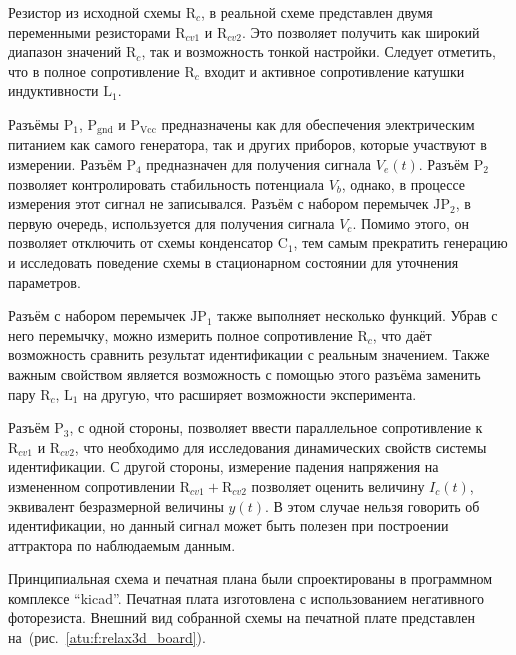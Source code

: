 Резистор из исходной схемы $\mathrm{R}_c$,
в реальной схеме представлен двумя переменными резисторами
$\mathrm{R}_{cv1}$ и
$\mathrm{R}_{cv2}$. Это позволяет получить как широкий диапазон значений $\mathrm{R}_c$,
так и возможность тонкой настройки.
Следует отметить, что в полное сопротивление $\mathrm{R}_c$
входит и активное сопротивление катушки индуктивности $\mathrm{L}_{1}$.

Разъёмы $\mathrm{P}_1$, $\mathrm{P}_\mathrm{gnd}$ и $\mathrm{P}_\mathrm{Vcc}$
предназначены как для обеспечения электрическим питанием как самого генератора,
так и других приборов, которые участвуют в измерении.
Разъём $\mathrm{P}_4$ предназначен для получения сигнала $V_e(t)$.
Разъём $\mathrm{P}_2$ позволяет контролировать стабильность
потенциала $V_b$, однако, в процессе измерения этот сигнал не записывался.
Разъём с набором перемычек $\mathrm{JP}_2$, в первую очередь,
используется для получения сигнала $V_c$. Помимо этого,
он позволяет отключить от схемы конденсатор $\mathrm{C}_1$,
тем самым прекратить генерацию и исследовать поведение схемы в стационарном состоянии
для уточнения параметров.

Разъём с набором перемычек $\mathrm{JP}_1$ также выполняет несколько функций.
Убрав с него перемычку, можно измерить полное сопротивление $\mathrm{R}_{c}$,
что даёт возможность сравнить результат идентификации с реальным значением.
Также важным свойством является возможность с помощью этого разъёма
заменить пару $\mathrm{R}_{c}$, $\mathrm{L}_{1}$
на другую, что расширяет возможности эксперимента.

Разъём  $\mathrm{P}_{3}$, с одной стороны, позволяет
ввести параллельное сопротивление к
$\mathrm{R}_{cv1}$ и
$\mathrm{R}_{cv2}$, что необходимо для исследования динамических
свойств системы идентификации. С другой стороны,
измерение падения напряжения на измененном сопротивлении $\mathrm{R}_{cv1} +\mathrm{R}_{cv2}$
позволяет оценить величину $I_c(t)$, эквивалент безразмерной величины $y(t)$.
В этом случае нельзя говорить об идентификации, но данный сигнал может быть полезен
при построении аттрактора по наблюдаемым данным.


Принципиальная схема и печатная плана были спроектированы в
программном комплексе ``kicad''. %
Печатная плата изготовлена с использованием негативного фоторезиста.
Внешний вид собранной схемы на печатной плате представлен на~(рис.~\ref{atu:f:relax3d_board}).

